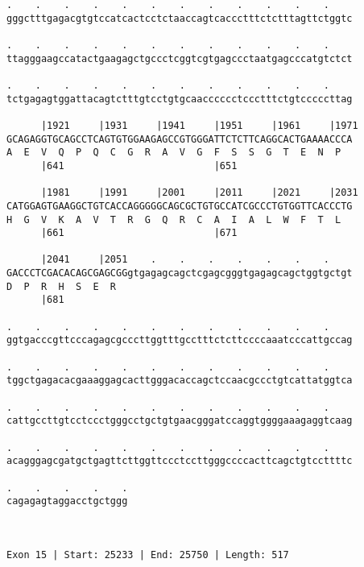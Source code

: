 \documentclass{article}
\begin{document}
\begin{Verbatim}
.    .    .    .    .    .    .    .    .    .    .    .    
gggctttgagacgtgtccatcactcctctaaccagtcaccctttctctttagttctggtc
                                                            
.    .    .    .    .    .    .    .    .    .    .    .    
ttagggaagccatactgaagagctgccctcggtcgtgagccctaatgagcccatgtctct
                                                            
.    .    .    .    .    .    .    .    .    .    .    .    
tctgagagtggattacagtctttgtcctgtgcaacccccctccctttctgtcccccttag
                                                            
      |1921     |1931     |1941     |1951     |1961     |1971
GCAGAGGTGCAGCCTCAGTGTGGAAGAGCCGTGGGATTCTCTTCAGGCACTGAAAACCCA
A  E  V  Q  P  Q  C  G  R  A  V  G  F  S  S  G  T  E  N  P  
      |641                          |651                    
  
      |1981     |1991     |2001     |2011     |2021     |2031
CATGGAGTGAAGGCTGTCACCAGGGGGCAGCGCTGTGCCATCGCCCTGTGGTTCACCCTG
H  G  V  K  A  V  T  R  G  Q  R  C  A  I  A  L  W  F  T  L  
      |661                          |671                    
  
      |2041     |2051    .    .    .    .    .    .    .    
GACCCTCGACACAGCGAGCGGgtgagagcagctcgagcgggtgagagcagctggtgctgt
D  P  R  H  S  E  R                                         
      |681                                                  
  
.    .    .    .    .    .    .    .    .    .    .    .    
ggtgacccgttcccagagcgcccttggtttgcctttctcttccccaaatcccattgccag
                                                            
.    .    .    .    .    .    .    .    .    .    .    .    
tggctgagacacgaaaggagcacttgggacaccagctccaacgccctgtcattatggtca
                                                            
.    .    .    .    .    .    .    .    .    .    .    .    
cattgccttgtcctccctgggcctgctgtgaacgggatccaggtggggaaagaggtcaag
                                                            
.    .    .    .    .    .    .    .    .    .    .    .    
acagggagcgatgctgagttcttggttccctccttgggccccacttcagctgtccttttc
                                                            
.    .    .    .    .
cagagagtaggacctgctggg
                     
                     
 
Exon 15 | Start: 25233 | End: 25750 | Length: 517




\end{Verbatim}
\end{document}
